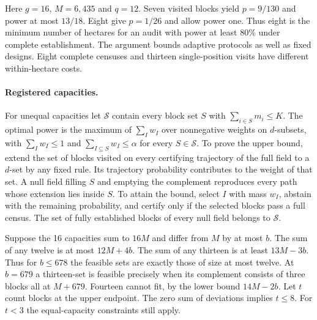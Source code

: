 \documentclass[10pt]{article}
\begin{document}
Here $g=16$, $M=6{,}435$ and $q=12$. Seven visited blocks yield $p=9/130$ and power at most $13/18$. Eight give $p=1/26$ and allow power one. Thus eight is the minimum number of hectares for an audit with power at least $80\%$ under complete establishment. The argument bounds adaptive protocols as well as fixed designs. Eight complete censuses and thirteen single-position visits have different within-hectare costs.

\paragraph{Registered capacities.}
For unequal capacities let $\mathcal S$ contain every block set $S$ with $\sum_{i\in S}m_i\leq K$. The optimal power is the maximum of $\sum_I w_I$ over nonnegative weights on $d$-subsets, with $\sum_I w_I\leq1$ and $\sum_{I\subseteq S}w_I\leq\alpha$ for every $S\in\mathcal S$. To prove the upper bound, extend the set of blocks visited on every certifying trajectory of the full field to a $d$-set by any fixed rule. Its trajectory probability contributes to the weight of that set. A null field filling $S$ and emptying the complement reproduces every path whose extension lies inside $S$. To attain the bound, select $I$ with mass $w_I$, abstain with the remaining probability, and certify only if the selected blocks pass a full census. The set of fully established blocks of every null field belongs to $\mathcal S$.

Suppose the 16 capacities sum to $16M$ and differ from $M$ by at most $b$. The sum of any twelve is at most $12M+4b$. The sum of any thirteen is at least $13M-3b$. Thus for $b\leq678$ the feasible sets are exactly those of size at most twelve. At $b=679$ a thirteen-set is feasible precisely when its complement consists of three blocks all at $M+679$. Fourteen cannot fit, by the lower bound $14M-2b$. Let $t$ count blocks at the upper endpoint. The zero sum of deviations implies $t\leq8$. For $t<3$ the equal-capacity constraints still apply.
\end{document}
